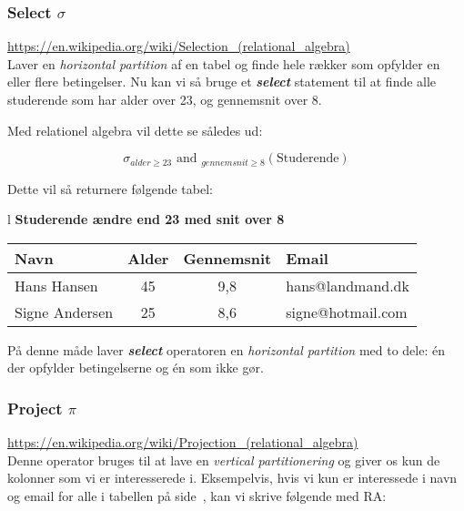 \subsubsection{Select $\sigma$}

\url{https://en.wikipedia.org/wiki/Selection_(relational_algebra)}\\

Laver en \textit{horizontal partition} af en tabel og finde hele rækker som opfylder en eller flere betingelser.
Nu kan vi så bruge et \textbf{\textit{select}} statement til at finde alle studerende som har alder over 23, og gennemsnit over 8.

Med relationel algebra vil dette se således ud:

\begin{equation*}
\sigma_{alder \geq 23}\text{ and } _{gennemsnit \geq 8} (\text{Studerende})
\end{equation*}

Dette vil så returnere følgende tabel:

\begin{center}
	\begin{tabular}{l}
		\textbf{\large Studerende ændre end 23 med snit over 8}	\\
		\begin{tabular}{|l|c|c|l|}
			\hline
			\textbf{Navn}&\textbf{Alder}&\textbf{Gennemsnit}&\textbf{Email}\\
			\hline
			Hans Hansen	& 45 & 9,8	& hans@landmand.dk		\\
			\hline
			Signe Andersen	& 25 & 8,6	& signe@hotmail.com		\\
			\hline
		\end{tabular}
	\end{tabular}
\end{center}

På denne måde laver \textbf{\textit{select}} operatoren en \textit{horizontal partition} med to dele: én der opfylder betingelserne og én som ikke gør.

\subsubsection{Project $\pi$}

\url{https://en.wikipedia.org/wiki/Projection_(relational_algebra)}\\

Denne operator bruges til at lave en \textit{vertical partitionering} og giver os kun de kolonner som vi er interesserede i. Eksempelvis, hvis vi kun er interessede i navn og email for alle i tabellen på side~\pageref{tab:stud}, kan vi skrive følgende med RA:

